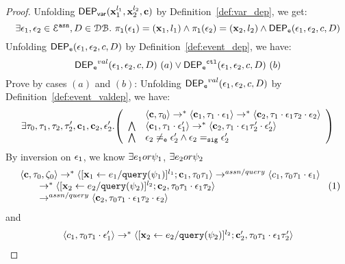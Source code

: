 \begin{proof}
Unfolding $\mathsf{DEP_{var}}({\boldsymbol{\mathbf{x}}}_1^{l_1}, {\boldsymbol{\mathbf{x}}}_2^{l_2}, {\boldsymbol{\mathbf{c}}})$ by Definition~\ref{def:var_dep},
we get:
\[
\exists \mathtt{\epsilon}_1, \mathtt{\epsilon}_2 \in \mathcal{E}^{\mathtt{{asn}}}, D \in \mathcal{DB}. ~
\mathtt{\pi_{l}(\mathtt{\epsilon}_1)} = ({\boldsymbol{\mathbf{x}}}_1, l_1)
\land
\mathtt{\pi_{l}(\mathtt{\epsilon}_2)} = ({\boldsymbol{\mathbf{x}}}_2, l_2)
\land 
\mathsf{DEP_{\mathtt{e}}}(\mathtt{\epsilon}_1, \mathtt{\epsilon}_2, c, D)
\]
%
Unfolding $\mathsf{DEP_{\mathtt{e}}}(\mathtt{\epsilon}_1, \mathtt{\epsilon}_2, c, D)$ by Definition~\ref{def:event_dep}, we have:
\[
\mathsf{DEP_{\mathtt{e}}}^{val}(\mathtt{\epsilon}_1, \mathtt{\epsilon}_2, c, D) ~ (a) 
\lor
\mathsf{DEP_{\mathtt{e}}}^{\mathtt{{ctl}}}(\mathtt{\epsilon}_1, \mathtt{\epsilon}_2, c, D) ~ (b)
\]
Prove by cases $(a)$ and $(b)$:
Unfolding $\mathsf{DEP_{\mathtt{e}}}^{val}(\mathtt{\epsilon}_1, \mathtt{\epsilon}_2, c, D)$ by Definition~\ref{def:event_valdep}, we have:
\[
\exists \vtrace_0,
\vtrace_1, \vtrace_2, \vtrace_2', \ssa{c}_1, \ssa{c}_2, \event_2'.
  \left(
  \begin{array}{ll}   
 & \config{\ssa{c}, \vtrace_0} \rightarrow^{*} 
\config{\ssa{c}_1, \vtrace_1 \cdot \event_1}  \rightarrow^{*} 
  \config{\ssa{c}_2,  \vtrace_1 \cdot \event_1 \vtrace_2 \cdot \event_2 } 
 \\ 
 \bigwedge &
  \config{\ssa{c}_1, \vtrace_1 \cdot \event_1'}  \rightarrow^{*} 
  \config{\ssa{c}_2,  \vtrace_1 \cdot \event_1 \vtrace_2' \cdot \event_2' } 
\\
\bigwedge &
\event_2 \eventneq \event_2' \land \event_2 \sigeq \event_2'
\end{array}
\right)
 \]
 By inversion  on $\mathtt{\epsilon}_1$, we know $\exists e_1 or \psi_1$, $\exists e_2 or \psi_2$
 \[
  \begin{array}{l}   
\langle {\boldsymbol{\mathbf{c}}}, \mathtt{\tau}_0, \mathtt{\zeta}_0 \rangle \rightarrow^{*} 
\langle [\mathrel{ {\boldsymbol{\mathbf{x}}}_1 \leftarrow e_1 / {\tt query}(\psi_1) }]^{l_1} ; {\boldsymbol{\mathbf{c}}}_1, \mathtt{\tau}_0 \mathtt{\tau}_1 \rangle  \rightarrow^{assn/query}
 \langle c_1, \mathtt{\tau}_0 \mathtt{\tau}_1 \cdot \mathtt{\epsilon}_1 \rangle \\
  \qquad \rightarrow^{*} 
  \langle [\mathrel{ {\boldsymbol{\mathbf{x}}}_2 \leftarrow e_2 / {\tt query}(\psi_2) }]^{l_2};{\boldsymbol{\mathbf{c}}}_2, 
  \mathtt{\tau}_0 \mathtt{\tau}_1 \cdot \mathtt{\epsilon}_1 \mathtt{\tau}_2 \rangle 
  \\
  \qquad \rightarrow^{assn/query} 
  \langle {\boldsymbol{\mathbf{c}}}_2,  \mathtt{\tau}_0 \mathtt{\tau}_1 \cdot \mathtt{\epsilon}_1 \mathtt{\tau}_2 \cdot \mathtt{\epsilon}_2 \rangle 
\end{array} ~ (1)
 \]
 and 
  \[
  \begin{array}{l}   
  \langle c_1, \mathtt{\tau}_0 \mathtt{\tau}_1 \cdot \mathtt{\epsilon}_1' \rangle 
  \rightarrow^{*} 
  \langle [\mathrel{ {\boldsymbol{\mathbf{x}}}_2 \leftarrow e_2 / {\tt query}(\psi_2) }]^{l_2} ; {\boldsymbol{\mathbf{c}}}_2', \mathtt{\tau}_0 \mathtt{\tau}_1 \cdot \mathtt{\epsilon}_1 \mathtt{\tau}_2' \rangle 
  \\

\end{array}\]
\end{proof}
